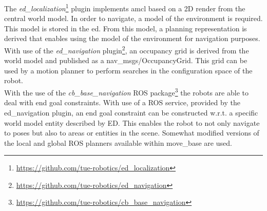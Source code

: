 The \emph{ed\_localization}\footnote{\url{https://github.com/tue-robotics/ed_localization}} plugin implements \acrshort{amcl} based on a 2D render from the central world model. In order to navigate, a model of the environment is required. This model is stored in the \acrshort{ed}. From this model, a planning representation is derived that enables using the model of the environment for navigation purposes.
\\
With use of the \emph{ed\_navigation} plugin\footnote{\url{https://github.com/tue-robotics/ed_navigation}}, an occupancy grid is derived from the world model and published as a nav\_msgs/OccupancyGrid. This grid can be used by a motion planner to perform searches in the configuration space of the robot.
\\
With the use of the \emph{cb\_base\_navigation} ROS package\footnote{\url{https://github.com/tue-robotics/cb_base_navigation}} the robots are able to deal with end goal constraints. With use of a ROS service, provided by the ed\_navigation plugin, an end goal constraint can be constructed w.r.t. a specific world model entity described by ED. This enables the robot to not only navigate to poses but also to areas or entities in the scene.
Somewhat modified versions of the local and global ROS planners available within move\_base are used.
